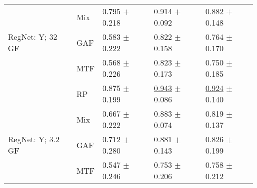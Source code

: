 \begin{tabular}{lllll}
 & Mix & \textcolor[rgb]{0.2352941176,0.5000000000,0}{0.795} $\pm$ \textcolor[rgb]{0.7808184292,0.2191815708,0}{0.218} & \underline{\textcolor[rgb]{0.1354581673,0.5000000000,0}{0.914}} $\pm$ \textcolor[rgb]{0.1734181887,0.5000000000,0}{0.092} & \textcolor[rgb]{0.2729057592,0.5000000000,0}{0.882} $\pm$ \textcolor[rgb]{0.2337917794,0.5000000000,0}{0.148} \\
RegNet: Y; 32 GF & GAF & \textcolor[rgb]{0.6470588235,0.3529411765,0}{0.583} $\pm$ \textcolor[rgb]{0.7931155389,0.2068844611,0}{0.222} & \textcolor[rgb]{0.4435590969,0.5000000000,0}{0.822} $\pm$ \textcolor[rgb]{0.5423669416,0.4576330584,0}{0.158} & \textcolor[rgb]{0.6400523560,0.3599476440,0}{0.764} $\pm$ \textcolor[rgb]{0.3377261871,0.5000000000,0}{0.170} \\
 & MTF & \textcolor[rgb]{0.6764705882,0.3235294118,0}{0.568} $\pm$ \textcolor[rgb]{0.8082238591,0.1917761409,0}{0.226} & \textcolor[rgb]{0.4409030544,0.5000000000,0}{0.823} $\pm$ \textcolor[rgb]{0.6253561540,0.3746438460,0}{0.173} & \textcolor[rgb]{0.6832460733,0.3167539267,0}{0.750} $\pm$ \textcolor[rgb]{0.4100739638,0.5000000000,0}{0.185} \\
 & RP & \textcolor[rgb]{0.0808823529,0.5000000000,0}{0.875} $\pm$ \textcolor[rgb]{0.7127864450,0.2872135550,0}{0.199} & \underline{\textcolor[rgb]{0.0398406375,0.5000000000,0}{0.943}} $\pm$ \textcolor[rgb]{0.1408376023,0.5000000000,0}{0.086} & \underline{\textcolor[rgb]{0.1433246073,0.5000000000,0}{0.924}} $\pm$ \textcolor[rgb]{0.1910808871,0.5000000000,0}{0.140} \\
 & Mix & \textcolor[rgb]{0.4852941176,0.5000000000,0}{0.667} $\pm$ \textcolor[rgb]{0.7931155389,0.2068844611,0}{0.222} & \textcolor[rgb]{0.2390438247,0.5000000000,0}{0.883} $\pm$ \textcolor[rgb]{0.0705412324,0.5000000000,0}{0.074} & \textcolor[rgb]{0.4672774869,0.5000000000,0}{0.819} $\pm$ \textcolor[rgb]{0.1771731194,0.5000000000,0}{0.137} \\
RegNet: Y; 3.2 GF & GAF & \textcolor[rgb]{0.3970588235,0.5000000000,0}{0.712} $\pm$ \textcolor[rgb]{1.0000000000,0.0000000000,0}{0.280} & \textcolor[rgb]{0.2470119522,0.5000000000,0}{0.881} $\pm$ \textcolor[rgb]{0.4576134518,0.5000000000,0}{0.143} & \textcolor[rgb]{0.4456806283,0.5000000000,0}{0.826} $\pm$ \textcolor[rgb]{0.4815370304,0.5000000000,0}{0.199} \\
 & MTF & \textcolor[rgb]{0.7176470588,0.2823529412,0}{0.547} $\pm$ \textcolor[rgb]{0.8782313605,0.1217686395,0}{0.246} & \textcolor[rgb]{0.6758420862,0.3241579138,0}{0.753} $\pm$ \textcolor[rgb]{0.8086742020,0.1913257980,0}{0.206} & \textcolor[rgb]{0.6596858639,0.3403141361,0}{0.758} $\pm$ \textcolor[rgb]{0.5449560239,0.4550439761,0}{0.212} \\

\end{tabular}

